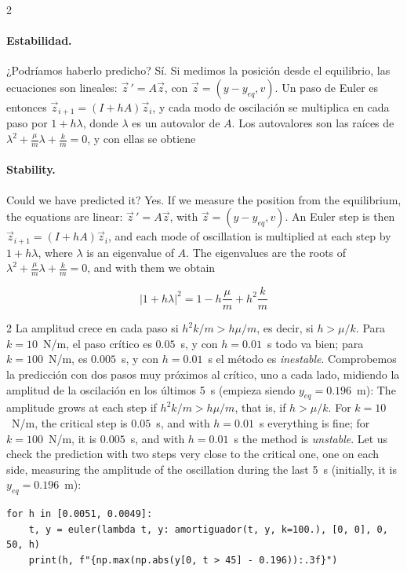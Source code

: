 \begin{paracol}{2}
\paragraph{Estabilidad.} ¿Podríamos haberlo predicho? Sí. Si medimos la posición desde el equilibrio, las ecuaciones son lineales: $\vec z\,'=A\vec z$, con $\vec z=(y-y_{eq},v)$. Un paso de Euler es entonces $\vec z_{i+1}=(I+hA)\vec z_i$, y cada modo de oscilación se multiplica en cada paso por $1+h\lambda$, donde $\lambda$ es un autovalor de $A$. Los autovalores son las raíces de $\lambda^2+\frac{\mu}{m}\lambda+\frac{k}{m}=0$, y con ellas se obtiene
\switchcolumn
\paragraph{Stability.} Could we have predicted it? Yes. If we measure the position from the equilibrium, the equations are linear: $\vec z\,'=A\vec z$, with $\vec z=(y-y_{eq},v)$. An Euler step is then $\vec z_{i+1}=(I+hA)\vec z_i$, and each mode of oscillation is multiplied at each step by $1+h\lambda$, where $\lambda$ is an eigenvalue of $A$. The eigenvalues are the roots of $\lambda^2+\frac{\mu}{m}\lambda+\frac{k}{m}=0$, and with them we obtain
\end{paracol}
\begin{equation*}
\lvert 1+h\lambda\rvert^2=1-h\frac{\mu}{m}+h^2\frac{k}{m}
\end{equation*}
\begin{paracol}{2}
La amplitud crece en cada paso si $h^2k/m>h\mu/m$, es decir, si $h>\mu/k$. Para $k=10$~N/m, el paso crítico es $0.05$~s, y con $h=0.01$~s todo va bien; para $k=100$~N/m, es $0.005$~s, y con $h=0.01$~s el método es \emph{inestable}. Comprobemos la predicción con dos pasos muy próximos al crítico, uno a cada lado, midiendo la amplitud de la oscilación en los últimos 5~s (empieza siendo $y_{eq}=0.196$~m):
\switchcolumn
The amplitude grows at each step if $h^2k/m>h\mu/m$, that is, if $h>\mu/k$. For $k=10$~N/m, the critical step is $0.05$~s, and with $h=0.01$~s everything is fine; for $k=100$~N/m, it is $0.005$~s, and with $h=0.01$~s the method is \emph{unstable}. Let us check the prediction with two steps very close to the critical one, one on each side, measuring the amplitude of the oscillation during the last 5~s (initially, it is $y_{eq}=0.196$~m):
\end{paracol}
\begin{verbatim}
for h in [0.0051, 0.0049]:
    t, y = euler(lambda t, y: amortiguador(t, y, k=100.), [0, 0], 0, 50, h)
    print(h, f"{np.max(np.abs(y[0, t > 45] - 0.196)):.3f}")
\end{verbatim}
